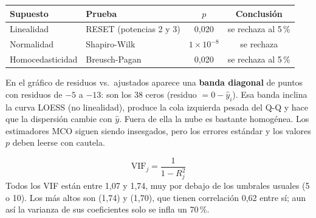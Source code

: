 \begin{center}\small
\begin{tabular}{llcc}
\toprule
Supuesto & Prueba & $p$ & Conclusión \\ \midrule
Linealidad & RESET (potencias 2 y 3) & 0,020 & se rechaza al 5\,\% \\
Normalidad & Shapiro-Wilk & $1\times10^{-8}$ & se rechaza \\
Homocedasticidad & Breusch-Pagan & 0,020 & se rechaza al 5\,\% \\ \bottomrule
\end{tabular}
\end{center}
En el gráfico de residuos vs.\ ajustados aparece una \textbf{banda diagonal} de puntos con residuos de
$-5$ a $-13$: son los 38 ceros (residuo $=0-\hat y_i$). Esa banda inclina la curva LOESS (no linealidad),
produce la cola izquierda pesada del Q-Q y hace que la dispersión cambie con $\hat y$. Fuera de ella la
nube es bastante homogénea. Los estimadores MCO siguen siendo insesgados, pero los errores estándar y
los valores $p$ deben leerse con cautela.


\[
\text{VIF}_j=\frac{1}{1-R_j^2}
\]
Todos los VIF están entre 1,07 y 1,74, muy por debajo de los umbrales usuales (5 o 10). Los más altos son
 (1,74) y  (1,70), que tienen correlación 0,62 entre sí; aun así
la varianza de sus coeficientes solo se infla un 70\,\%.


